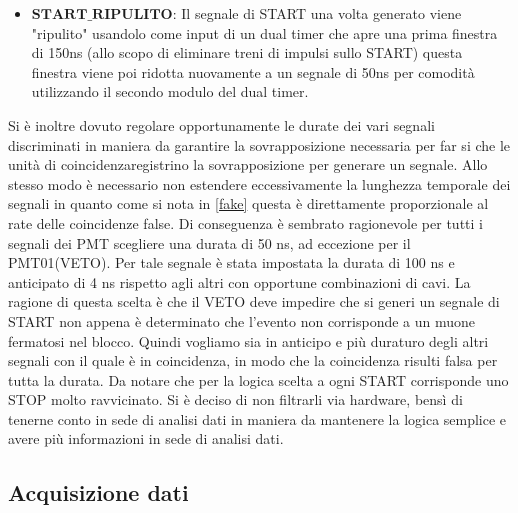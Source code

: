 \documentclass[10pt,a4paper]{article}
\begin{document}
\begin{flushleft}
\begin{itemize}
    \item $\textbf{START\_RIPULITO}$: Il segnale di START una volta generato viene "ripulito" usandolo come input di un dual timer che apre una prima finestra di 150ns (allo scopo di eliminare treni di impulsi sullo START) questa finestra viene poi ridotta nuovamente a un segnale di 50ns per comodità utilizzando il secondo modulo del dual timer.
       
\end{itemize}

Si è inoltre dovuto regolare opportunamente le durate dei vari segnali discriminati in maniera da garantire la sovrapposizione necessaria per far si che le unità di coincidenzaregistrino la sovrapposizione per generare un segnale. Allo stesso modo è necessario non estendere eccessivamente la lunghezza temporale dei segnali in quanto come si nota in \ref{fake} questa è direttamente proporzionale al rate delle coincidenze false. Di conseguenza è sembrato ragionevole per tutti i segnali dei PMT scegliere una durata di 50 ns, ad eccezione per il PMT01(VETO).
Per tale segnale è stata impostata la durata di 100 ns e anticipato di 4 ns rispetto agli altri con opportune combinazioni di cavi. 
La ragione di questa scelta è che il VETO deve impedire che si generi un segnale di START non appena è determinato che l'evento non corrisponde a un muone fermatosi nel blocco. Quindi vogliamo sia in anticipo e più duraturo degli altri segnali con il quale è in coincidenza, in modo che la coincidenza risulti falsa per tutta la durata.
Da notare che per la logica scelta a ogni START corrisponde uno STOP molto ravvicinato. Si è deciso di non filtrarli via hardware, bensì di tenerne conto in sede di analisi dati in maniera da mantenere la logica semplice e avere più informazioni in sede di analisi dati.

\end{flushleft}

\subsection{Acquisizione dati}\label{subsec:logica_prog}
\end{document}
